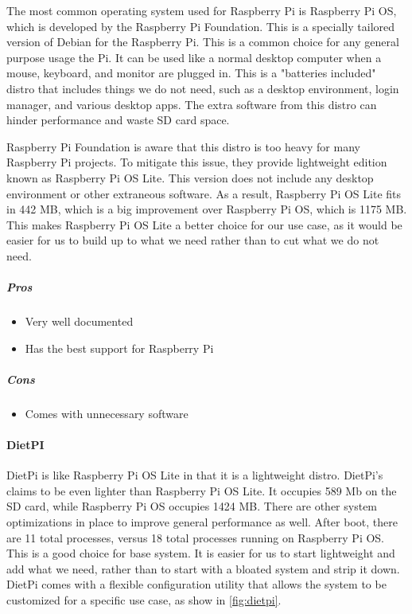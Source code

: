 The most common operating system used for Raspberry Pi is Raspberry Pi OS, which is
developed by the Raspberry Pi Foundation. This is a specially tailored version of Debian
for the Raspberry Pi. This is a common choice for any general purpose usage the Pi. It can
be used like a normal desktop computer when a mouse, keyboard, and monitor are plugged in.
This is a "batteries included" distro that includes things we do not need, such as a
desktop environment, login manager, and various desktop apps. The extra software from this
distro can hinder performance and waste SD card space.

Raspberry Pi Foundation is aware that this distro is too heavy for many Raspberry Pi
projects. To mitigate this issue, they provide lightweight edition known as Raspberry Pi
OS Lite. This version does not include any desktop environment or other extraneous
software. As a result, Raspberry Pi OS Lite fits in 442 MB, which is a big improvement
over Raspberry Pi OS, which is 1175 MB. This makes Raspberry Pi OS Lite a better choice
for our use case, as it would be easier for us to build up to what we need rather than to
cut what we do not need.

\subparagraph{Pros}
\begin{itemize}
  \item Very well documented
  \item Has the best support for Raspberry Pi
\end{itemize}

\subparagraph{Cons}
\begin{itemize}
  \item Comes with unnecessary software
\end{itemize}

\paragraph{DietPI}

DietPi is like Raspberry Pi OS Lite in that it is a lightweight distro. DietPi's claims to
be even lighter than Raspberry Pi OS Lite. It occupies 589 Mb on the SD card, while
Raspberry Pi OS occupies 1424 MB. There are other system optimizations in place to improve
general performance as well. After boot, there are 11 total processes, versus 18 total
processes running on Raspberry Pi OS. This is a good choice for base system. It is easier
for us to start lightweight and add what we need, rather than to start with a bloated
system and strip it down. DietPi comes with a flexible configuration utility that allows
the system to be customized for a specific use case, as show in \autoref{fig:dietpi}.


